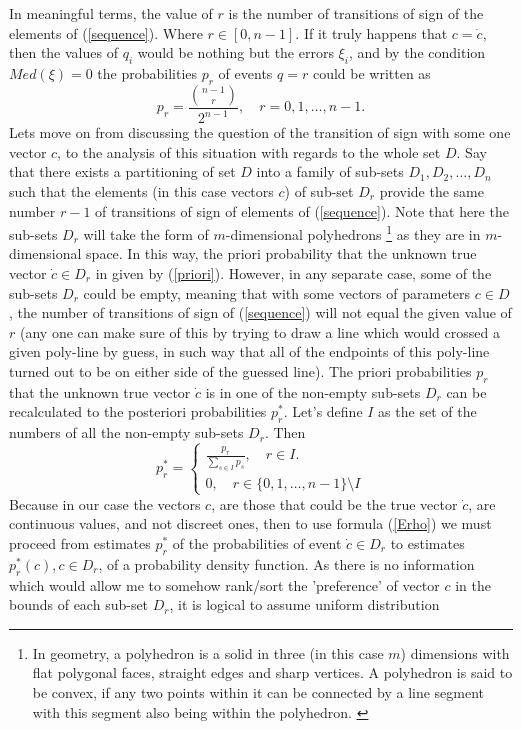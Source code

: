 In meaningful terms, the value of $r$ is the number of transitions of sign of the elements of  (\ref{sequence}). Where $r \in [0,n-1]$. If it truly happens that $c=\dot{c}$, then the values of $q_{i}$ would be nothing but the errors $\xi_{i}$, and by the condition $Med(\xi)=0$ the probabilities $p_{r}$ of events $q = r$ could be written as
\begin{equation}
p_{r}= \frac{\binom {n-1}r}{2^{n-1}}, \quad r = 0,1,\dots,n-1. \label{priori}
\end{equation}
Lets move on from discussing the question of the transition of sign with some one vector $c$, to the analysis of this situation with regards to the whole set $D$. Say that there exists a partitioning of set $D$ into a family of sub-sets $D_{1},D_{2},\dots,D_{n}$ such that the elements (in this case vectors $c$) of sub-set $D_{r}$ provide the same number $r-1$ of transitions of sign of elements of (\ref{sequence}). Note that here the sub-sets $D_{r}$ will take the form of $m$-dimensional polyhedrons \footnote{In geometry, a polyhedron is a solid in three (in this case $m$) dimensions with flat polygonal faces, straight edges and sharp vertices. A polyhedron is said to be convex, if any two points within it can be connected by a line segment with this segment also being within the polyhedron. \cite{cromwell_1999}} as they are in $m$-dimensional space. In this way, the priori probability that the unknown true vector $\dot{c} \in D_{r}$ in given by (\ref{priori}). However, in any separate case, some of the sub-sets $D_{r}$ could be empty, meaning  that with some vectors of parameters $c \in D$, the number of transitions of sign of (\ref{sequence}) will not equal the given value of $r$ (any one can make sure of this by trying to draw a line which would crossed a given poly-line by guess, in such way that all of the endpoints of this poly-line turned out to be on either side of the guessed line). The priori probabilities $p_{r}$ that the unknown true vector $\dot{c}$ is in one of the non-empty sub-sets $D_{r}$ can be recalculated to the posteriori probabilities $p_{r}^{*}$. Let's define $I$ as the set of the numbers of all the non-empty sub-sets $D_{r}$. Then
\begin{equation}
p_{r}^{*}= 
\begin{cases} 
		\frac{p_{r}}{\sum\limits_{s \in I}p_{s}}, \quad r \in I.\\
		0, \quad r \in \{ 0,1,\dots,n-1 \} \setminus I
\end{cases}
\end{equation}
Because in our case the vectors $c$, are those that could be the true vector $\dot{c}$, are continuous values, and not discreet ones, then to use formula (\ref{Erho}) we must proceed from estimates $p_{r}^{*}$ of the probabilities of event $\dot{c} \in D_{r}$ to estimates $p_{r}^{*}(c), c \in D_{r}$, of a probability density function. As there is no information  which would allow me to somehow rank/sort the 'preference' of vector $c$ in the bounds of each sub-set $D_{r}$, it is logical to assume uniform distribution

